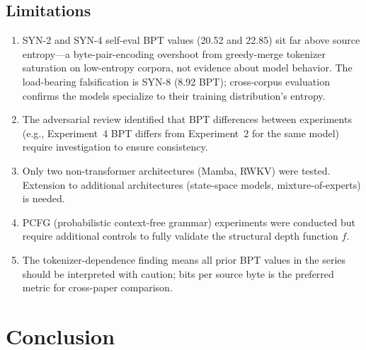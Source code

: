 \documentclass[11pt]{article}
\begin{document}
\subsection{Limitations}

\begin{enumerate}
\item SYN-2 and SYN-4 self-eval BPT values (20.52 and 22.85) sit far above source entropy---a byte-pair-encoding overshoot from greedy-merge tokenizer saturation on low-entropy corpora, not evidence about model behavior. The load-bearing falsification is SYN-8 (8.92 BPT); cross-corpus evaluation confirms the models specialize to their training distribution's entropy.
\item The adversarial review identified that BPT differences between experiments (e.g., Experiment~4 BPT differs from Experiment~2 for the same model) require investigation to ensure consistency.
\item Only two non-transformer architectures (Mamba, RWKV) were tested. Extension to additional architectures (state-space models, mixture-of-experts) is needed.
\item PCFG (probabilistic context-free grammar) experiments were conducted but require additional controls to fully validate the structural depth function $f$.
\item The tokenizer-dependence finding means all prior BPT values in the series should be interpreted with caution; bits per source byte is the preferred metric for cross-paper comparison.
\end{enumerate}

\section{Conclusion}
\end{document}
